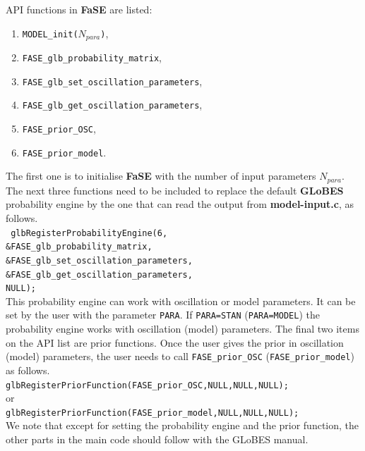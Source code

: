\documentclass[aps,prd,nofootinbib,preprint]{revtex4}
\begin{document}
API functions in \textbf{FaSE} are listed:
\begin{enumerate}
\item \texttt{MODEL\_init($N_{para}$)},
\item  \texttt{FASE\_glb\_probability\_matrix},
\item  \texttt{FASE\_glb\_set\_oscillation\_parameters},
\item  \texttt{FASE\_glb\_get\_oscillation\_parameters},
\item \texttt{FASE\_prior\_OSC},
\item \texttt{FASE\_prior\_model}.
\end{enumerate}
The first one is to initialise \textbf{FaSE} with the number of input parameters $N_{para}$. The next three functions need to be included to replace the default \textbf{GLoBES} probability engine by the one that can read the output from \textbf{model-input.c}, as follows.\vspace{0.2cm}\\
\texttt{    glbRegisterProbabilityEngine(6,\\
                                 \&FASE\_glb\_probability\_matrix,\\
                                 \&FASE\_glb\_set\_oscillation\_parameters,\\
                                 \&FASE\_glb\_get\_oscillation\_parameters,\\
                                 NULL); }\vspace{0.2cm}\\ 
This probability engine can work with oscillation or model parameters. It can be set by the user with the parameter \texttt{PARA}. If \texttt{PARA=STAN} (\texttt{PARA=MODEL}) the probability engine works with oscillation (model) parameters. The final two items on the API list are prior functions. Once the user gives the prior in oscillation (model) parameters, the user needs to call \texttt{FASE\_prior\_OSC} (\texttt{FASE\_prior\_model}) as follows.\vspace{0.2cm}\\
\texttt{glbRegisterPriorFunction(FASE\_prior\_OSC,NULL,NULL,NULL); }  \\
or\\
\texttt{glbRegisterPriorFunction(FASE\_prior\_model,NULL,NULL,NULL); } \vspace{0.2cm}\\
We note that except for setting the probability engine and the prior function, the other parts in the main code should follow with the GLoBES manual. 
\end{document}
